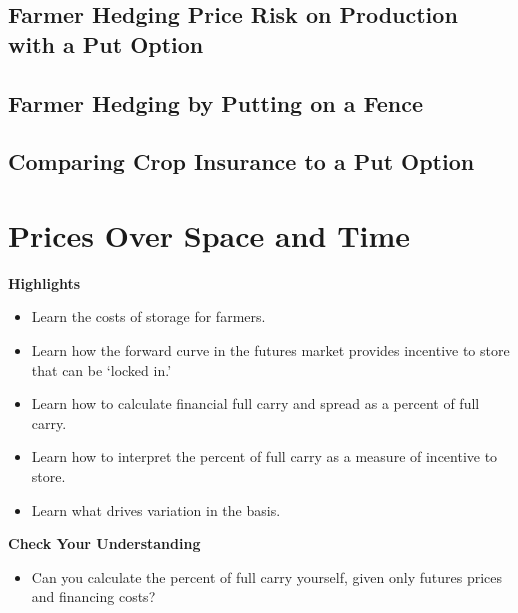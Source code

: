 \documentclass[
]{book}
\providecommand{\tightlist}{%
  \setlength{\itemsep}{0pt}\setlength{\parskip}{0pt}}
\begin{document}
\hypertarget{farmer-hedging-price-risk-on-production-with-a-put-option}{%
\section{Farmer Hedging Price Risk on Production with a Put Option}\label{farmer-hedging-price-risk-on-production-with-a-put-option}}

\hypertarget{farmer-hedging-by-putting-on-a-fence}{%
\section{Farmer Hedging by Putting on a Fence}\label{farmer-hedging-by-putting-on-a-fence}}

\hypertarget{comparing-crop-insurance-to-a-put-option}{%
\section{Comparing Crop Insurance to a Put Option}\label{comparing-crop-insurance-to-a-put-option}}

\hypertarget{prices-over-space-and-time}{%
\chapter{Prices Over Space and Time}\label{prices-over-space-and-time}}

\textbf{Highlights}

\begin{itemize}
\tightlist
\item
  Learn the costs of storage for farmers.
\item
  Learn how the forward curve in the futures market provides incentive to store that can be `locked in.'
\item
  Learn how to calculate financial full carry and spread as a percent of full carry.
\item
  Learn how to interpret the percent of full carry as a measure of incentive to store.
\item
  Learn what drives variation in the basis.
\end{itemize}

\textbf{Check Your Understanding}

\begin{itemize}
\tightlist
\item
  Can you calculate the percent of full carry yourself, given only futures prices and financing costs?
\end{itemize}
\end{document}
